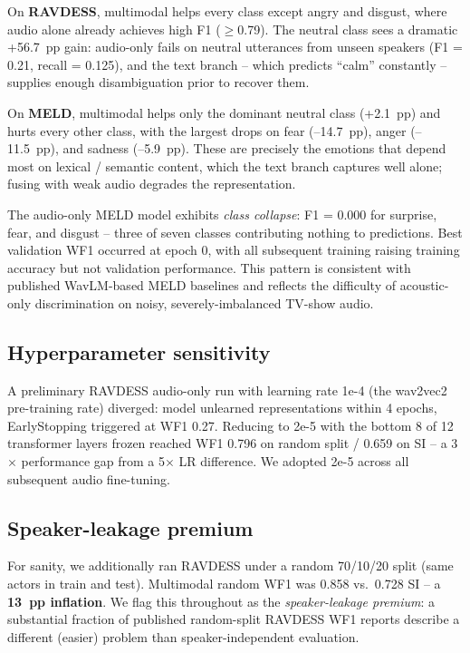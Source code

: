 \documentclass[a4paper,10pt]{article}
\begin{document}
On \textbf{RAVDESS}, multimodal helps every class except angry and disgust,
where audio alone already achieves high F1 ($\geq$0.79). The neutral class
sees a dramatic +56.7~pp gain: audio-only fails on neutral utterances from
unseen speakers (F1 = 0.21, recall = 0.125), and the text branch -- which
predicts ``calm'' constantly -- supplies enough disambiguation prior to
recover them.

On \textbf{MELD}, multimodal helps only the dominant neutral class (+2.1~pp)
and hurts every other class, with the largest drops on fear (--14.7~pp),
anger (--11.5~pp), and sadness (--5.9~pp). These are precisely the emotions
that depend most on lexical / semantic content, which the text branch
captures well alone; fusing with weak audio degrades the representation.

The audio-only MELD model exhibits \emph{class collapse}: F1 = 0.000 for
surprise, fear, and disgust -- three of seven classes contributing nothing
to predictions. Best validation WF1 occurred at epoch 0, with all
subsequent training raising training accuracy but not validation
performance. This pattern is consistent with published WavLM-based MELD
baselines and reflects the difficulty of acoustic-only discrimination on
noisy, severely-imbalanced TV-show audio.

\subsection{Hyperparameter sensitivity}
\label{sec:hparams}

A preliminary RAVDESS audio-only run with learning rate 1e-4 (the
wav2vec2 pre-training rate) diverged: model unlearned representations
within 4 epochs, EarlyStopping triggered at WF1 0.27. Reducing to 2e-5
with the bottom 8 of 12 transformer layers frozen reached WF1 0.796 on
random split / 0.659 on SI -- a 3$\times$ performance gap from a 5$\times$
LR difference. We adopted 2e-5 across all subsequent audio fine-tuning.

\subsection{Speaker-leakage premium}

For sanity, we additionally ran RAVDESS under a random 70/10/20 split
(same actors in train and test). Multimodal random WF1 was 0.858 vs.\
0.728 SI -- a \textbf{13~pp inflation}. We flag this throughout as the
\emph{speaker-leakage premium}: a substantial fraction of published
random-split RAVDESS WF1 reports describe a different (easier) problem
than speaker-independent evaluation.
\end{document}
